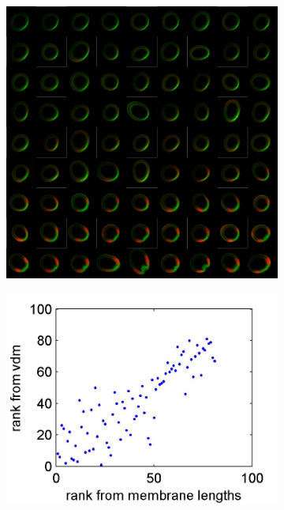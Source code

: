 \documentclass{pnastwo}
\begin{document}
\begin{figure}
\begin{minipage}{0.6\textwidth}
\begin{subfigure}{\textwidth}
\includegraphics[width=\textwidth]{registered_ordered_vdm_2d}
\caption{}
\label{subfig:images_vdm}
\end{subfigure}
\end{minipage}
\begin{minipage}{0.4\textwidth}
\begin{subfigure}{\textwidth}
\includegraphics[width=\textwidth]{rank_corr_vdm}

\end{subfigure}
\end{minipage}
\end{figure}
\end{document}
